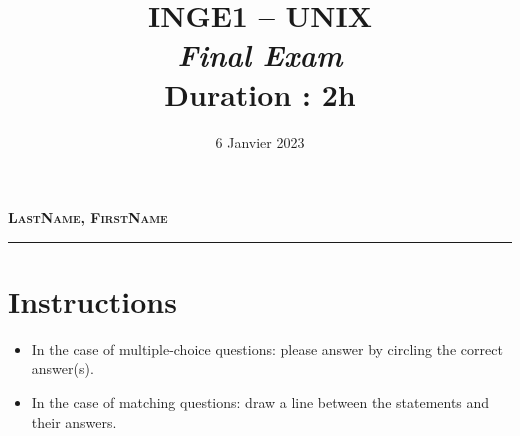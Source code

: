 \documentclass[11pt,a4paper]{article}
\title{\textsc{INGE1 -- UNIX}\\
    \emph{Final Exam} \\
    Duration : 2h
}
\date{6 Janvier 2023}
\begin{document}
\maketitle

\thispagestyle{empty}
\begin{figure}[!h]
    \centering
\end{figure}

\vfill
{\noindent\Large \textbf{\textsc{LastName, FirstName}}}\\[1cm]
\rule{0.8\textwidth}{1pt}

\vfill
\noindent{}
\newpage

\section*{Instructions}
\begin{itemize}
    \item In the case of multiple-choice questions: please answer by 
          circling the correct answer(s). 
    \item In the case of matching questions: draw a line between the 
          statements and their answers. 
\end{itemize}
\end{document}
